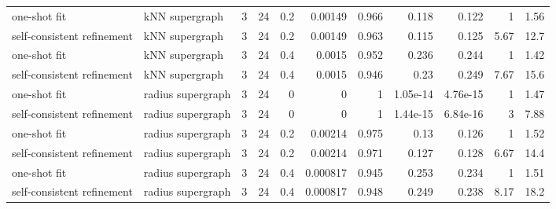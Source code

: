 \begin{table}[H]
{\begin{tabular}{llrrrrrrrrr}
one-shot fit & kNN supergraph & 3 & 24 & 0.2 & 0.00149 & 0.966 & 0.118 & 0.122 & 1 & 1.56 \\
self-consistent refinement & kNN supergraph & 3 & 24 & 0.2 & 0.00149 & 0.963 & 0.115 & 0.125 & 5.67 & 12.7 \\
one-shot fit & kNN supergraph & 3 & 24 & 0.4 & 0.0015 & 0.952 & 0.236 & 0.244 & 1 & 1.42 \\
self-consistent refinement & kNN supergraph & 3 & 24 & 0.4 & 0.0015 & 0.946 & 0.23 & 0.249 & 7.67 & 15.6 \\
one-shot fit & radius supergraph & 3 & 24 & 0 & 0 & 1 & 1.05e-14 & 4.76e-15 & 1 & 1.47 \\
self-consistent refinement & radius supergraph & 3 & 24 & 0 & 0 & 1 & 1.44e-15 & 6.84e-16 & 3 & 7.88 \\
one-shot fit & radius supergraph & 3 & 24 & 0.2 & 0.00214 & 0.975 & 0.13 & 0.126 & 1 & 1.52 \\
self-consistent refinement & radius supergraph & 3 & 24 & 0.2 & 0.00214 & 0.971 & 0.127 & 0.128 & 6.67 & 14.4 \\
one-shot fit & radius supergraph & 3 & 24 & 0.4 & 0.000817 & 0.945 & 0.253 & 0.234 & 1 & 1.51 \\
self-consistent refinement & radius supergraph & 3 & 24 & 0.4 & 0.000817 & 0.948 & 0.249 & 0.238 & 8.17 & 18.2 \\
\bottomrule
\end{tabular}
}
\end{table}
